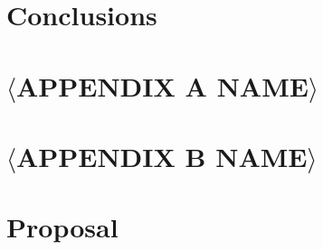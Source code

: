 \documentclass[12pt,a4paper,twoside,openright]{report}
\begin{document}
\chapter{Conclusions}



\newpage

\printbibliography


\appendix


\chapter{\(\langle\)APPENDIX A NAME\(\rangle\)}



\newpage

\chapter{\(\langle\)APPENDIX B NAME\(\rangle\)}



\newpage

\chapter{Proposal}



\end{document}
